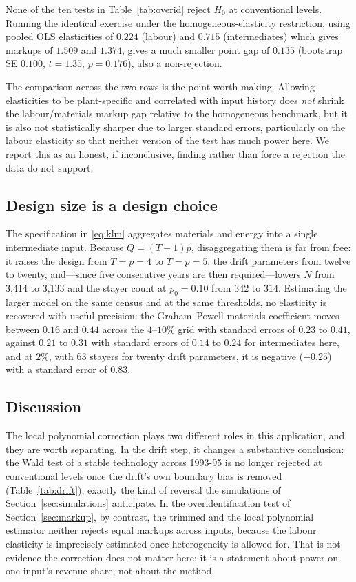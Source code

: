 \documentclass{article}
\begin{document}
None of the ten tests in Table~\ref{tab:overid} reject $H_0$ at conventional levels. Running the identical exercise under the homogeneous-elasticity restriction, using pooled OLS elasticities of $0.224$ (labour) and $0.715$ (intermediates) which gives markups of $1.509$ and $1.374$, gives a much smaller point gap of $0.135$ (bootstrap SE $0.100$, $t=1.35$, $p=0.176$), also a non-rejection.

The comparison across the two rows is the point worth making. Allowing elasticities to be plant-specific and correlated with input history does \emph{not} shrink the labour/materials markup gap relative to the homogeneous benchmark, but it is also not statistically sharper due to larger standard errors, particularly on the labour elasticity so that neither version of the test has much power here. We report this as an honest, if inconclusive, finding rather than force a rejection the data do not support.

\subsection{Design size is a design choice}
\label{sec:designsize}

The specification in \eqref{eq:klm} aggregates materials and energy into a
single intermediate input. Because $Q = (T-1)p$, disaggregating them is far
from free: it raises the design from $T = p = 4$ to $T = p = 5$, the drift
parameters from twelve to twenty, and---since five consecutive years are then
required---lowers $N$ from 3{,}414 to 3{,}133 and the stayer count at
$p_0 = 0.10$ from $342$ to $314$. Estimating the larger model on the same
census and at the same thresholds, no elasticity is recovered with useful
precision: the Graham--Powell materials coefficient moves between $0.16$ and $0.44$ across the
$4$--$10\%$ grid with standard errors of $0.23$ to $0.41$, against $0.21$ to
$0.31$ with standard errors of $0.14$ to $0.24$ for intermediates here, and at
$2\%$, with $63$ stayers for twenty drift parameters, it is negative ($-0.25$)
with a standard error of $0.83$.

\subsection{Discussion}
\label{sec:discussion}

The local polynomial correction plays two different roles in this application, and they are worth
separating. In the drift step, it changes a substantive conclusion: the Wald test of a stable
technology across 1993-95 is no longer rejected at conventional levels once the drift's own
boundary bias is removed (Table~\ref{tab:drift}), exactly the kind of reversal the simulations of
Section~\ref{sec:simulations} anticipate. In the overidentification test of Section~\ref{sec:markup},
by contrast, the trimmed and the local polynomial estimator neither rejects equal markups across inputs, because the labour elasticity is imprecisely estimated
once heterogeneity is allowed for. That is not evidence the correction does not matter here; it is a
statement about power on one input's revenue share, not about the method.
\end{document}
